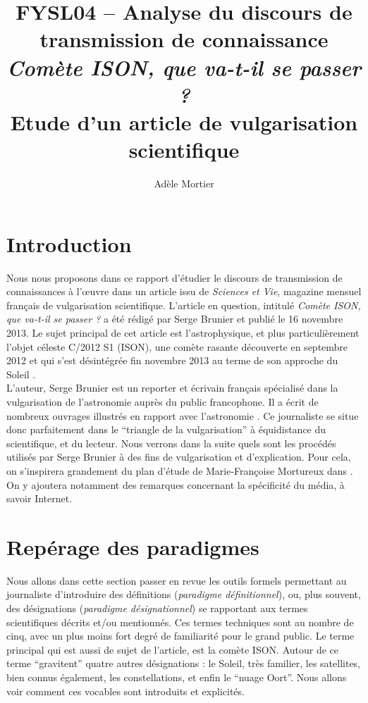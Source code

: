 \documentclass[a4paper,10pt]{article}
\title{FYSL04 -- Analyse du discours de transmission de connaissance\\
	\textit{Comète ISON, que va-t-il se passer ?}\\ \vspace{0.3cm}
	\small Etude d'un article de vulgarisation scientifique}
\author{Adèle Mortier}
\begin{document}
\maketitle
\nocite{*}
\tableofcontents

\section*{Introduction} \label{intro}
	Nous nous proposons dans ce rapport d'étudier le discours de transmission de connaissances à l'œuvre dans un article issu de \textit{Sciences et Vie}, magazine mensuel français de vulgarisation scientifique. L'article en question, intitulé \textit{Comète ISON, que va-t-il se passer ?} a été rédigé par Serge Brunier et publié le 16 novembre 2013. Le sujet principal de cet article est l'astrophysique, et plus particulièrement l'objet céleste C/2012 S1 (ISON), une comète rasante découverte en septembre 2012 et qui s'est désintégrée fin novembre 2013 au terme de son approche du Soleil \cite{ISON}.\\
	L'auteur, Serge Brunier est un reporter et écrivain français spécialisé dans la vulgarisation de l'astronomie auprès du public francophone. Il a écrit de nombreux ouvrages illustrés en rapport avec l'astronomie \cite{SB}. Ce journaliste se situe donc parfaitement dans le ``triangle de la vulgarisation'' à équidistance du scientifique, et du lecteur. Nous verrons dans la suite quels sont les procédés utilisés par Serge Brunier à des fins de vulgarisation et d'explication. Pour cela, on s'inspirera grandement du plan d'étude de Marie-Françoise Mortureux dans \cite{Mortureux1993}. On y ajoutera notamment des remarques concernant la spécificité du média, à savoir Internet.

\section{Repérage des paradigmes} \label{reperage}
	Nous allons dans cette section passer en revue les outils formels permettant au journaliste d'introduire des définitions (\textit{paradigme définitionnel}), ou, plus souvent, des désignations (\textit{paradigme désignationnel}) se rapportant aux termes scientifiques décrits et/ou mentionnés. Ces termes techniques sont au nombre de cinq, avec un plus moins fort degré de familiarité pour le grand public. Le terme principal qui est aussi de sujet de l'article, est la comète ISON. Autour de ce terme ``gravitent'' quatre autres désignations : le Soleil, très familier, les satellites, bien connus également, les constellations, et enfin le ``nuage Oort''. Nous allons voir comment ces vocables sont introduits et explicités. 
\end{document}
